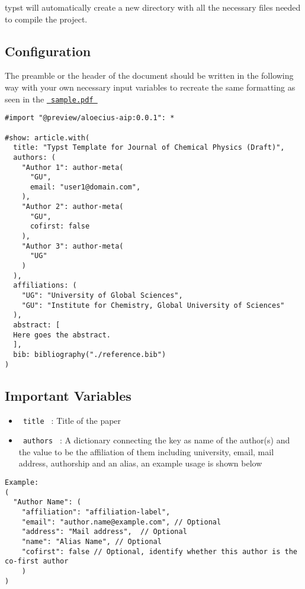 typst will automatically create a new directory with all the necessary
files needed to compile the project.

\subsection{Configuration}\label{configuration}

The preamble or the header of the document should be written in the
following way with your own necessary input variables to recreate the
same formatting as seen in the
\href{https://github.com/typst/packages/raw/main/packages/preview/aloecius-aip/0.0.1/sample.pdf}{\texttt{\ sample.pdf\ }}

\begin{verbatim}
#import "@preview/aloecius-aip:0.0.1": *

#show: article.with(
  title: "Typst Template for Journal of Chemical Physics (Draft)",
  authors: (
    "Author 1": author-meta(
      "GU",
      email: "user1@domain.com",
    ),
    "Author 2": author-meta(
      "GU",
      cofirst: false
    ),
    "Author 3": author-meta(
      "UG"
    )
  ),
  affiliations: (
    "UG": "University of Global Sciences",
    "GU": "Institute for Chemistry, Global University of Sciences"
  ),
  abstract: [
  Here goes the abstract. 
  ],
  bib: bibliography("./reference.bib")
)
\end{verbatim}

\subsection{Important Variables}\label{important-variables}

\begin{itemize}
\tightlist
\item
  \texttt{\ title\ } : Title of the paper
\item
  \texttt{\ authors\ } : A dictionary connecting the key as name of the
  author(s) and the value to be the affiliation of them including
  university, email, mail address, authorship and an alias, an example
  usage is shown below
\end{itemize}

\begin{verbatim}
Example:
(
  "Author Name": (
    "affiliation": "affiliation-label",
    "email": "author.name@example.com", // Optional
    "address": "Mail address",  // Optional
    "name": "Alias Name", // Optional
    "cofirst": false // Optional, identify whether this author is the co-first author
    )
)
\end{verbatim}

